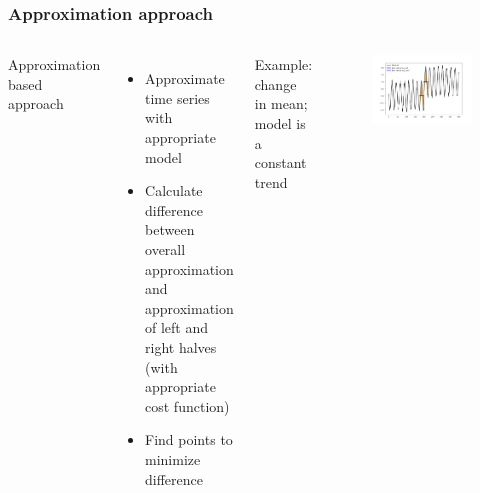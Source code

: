 \documentclass[intlimits, 9pt, unicode]{beamer}
\begin{document}
\begin{frame}
    \frametitle{Approximation approach}
  \begin{columns}[T,onlytextwidth]
	Approximation based approach
	    \begin{itemize}
	    	\item Approximate time series with appropriate model
		\item Calculate difference between overall approximation and approximation of left and right halves (with appropriate cost function)
		\item Find points to minimize difference
	    \end{itemize}
      Example: change in mean; model is a constant trend
      	\begin{figure}
		\includegraphics[scale=0.2]{images/approaches_second_2}
	\end{figure}
     \end{columns}
\end{frame}
\end{document}
